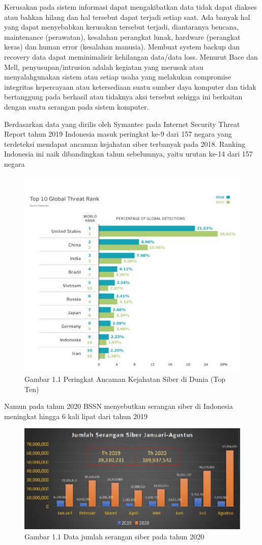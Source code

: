 \documentclass[conference]{IEEEtran}
\begin{document}
Kerusakan pada sistem informasi dapat mengakibatkan data tidak dapat diakses atau bahkan hilang dan hal tersebut dapat terjadi setiap saat. Ada banyak hal yang dapat menyebabkan kerusakan tersebut terjadi, diantaranya bencana, maintenance (perawatan), kesalahan perangkat lunak, hardware (perangkat keras) dan human error (kesalahan manusia). Membuat system backup dan recovery data dapat meminimalisir kehilangan data/data loss. Menurut Bace dan Mell, penyusupan/intrusion adalah kegiatan yang merusak atau menyalahgunakan sistem atau setiap usaha yang melakukan compromise integritas kepercayaan atau ketersediaan suatu sumber daya komputer dan tidak bertanggung pada berhasil atau tidaknya aksi tersebut sehigga ini berkaitan dengan suatu serangan pada sistem komputer.

Berdasarkan data yang dirilis oleh Symantec pada Internet Security Threat Report tahun 2019 Indonesia masuk peringkat ke-9 dari 157 negara yang terdeteksi mendapat ancaman kejahatan siber terbanyak pada 2018. Ranking Indonesia ini naik dibandingkan tahun sebelumnya, yaitu urutan ke-14 dari 157 negara

\begin{figure}
\centering
\includegraphics[width=.4\textwidth]{picture/Gambar 1.1.PNG}
\caption{Gambar 1.1 Peringkat Ancaman Kejahatan Siber di Dunia (Top Ten)}
\end{figure}

Namun pada tahun 2020 BSSN menyebutkan serangan siber di Indonesia meningkat hingga 6 kali lipat dari tahun 2019

\begin{figure}
\centering
\includegraphics[width=.4\textwidth]{picture/Gambar 1.2.PNG}
\caption{Gambar 1.1 Data jumlah serangan siber pada tahun 2020}
\end{figure}
\end{document}
